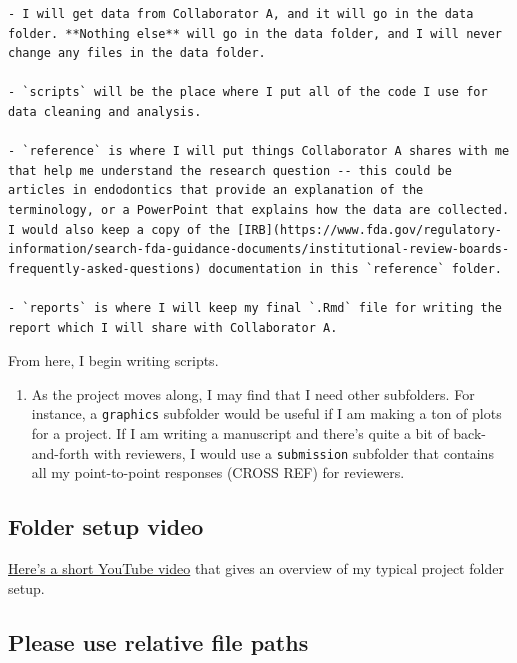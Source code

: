 \documentclass[
]{book}
\providecommand{\tightlist}{%
  \setlength{\itemsep}{0pt}\setlength{\parskip}{0pt}}
\begin{document}
\begin{verbatim}
- I will get data from Collaborator A, and it will go in the data folder. **Nothing else** will go in the data folder, and I will never change any files in the data folder.   

- `scripts` will be the place where I put all of the code I use for data cleaning and analysis. 

- `reference` is where I will put things Collaborator A shares with me that help me understand the research question -- this could be articles in endodontics that provide an explanation of the terminology, or a PowerPoint that explains how the data are collected. I would also keep a copy of the [IRB](https://www.fda.gov/regulatory-information/search-fda-guidance-documents/institutional-review-boards-frequently-asked-questions) documentation in this `reference` folder.  

- `reports` is where I will keep my final `.Rmd` file for writing the report which I will share with Collaborator A. 
\end{verbatim}

From here, I begin writing scripts.

\begin{enumerate}
\def\labelenumi{\arabic{enumi}.}
\setcounter{enumi}{4}
\tightlist
\item
  As the project moves along, I may find that I need other subfolders. For instance, a \texttt{graphics} subfolder would be useful if I am making a ton of plots for a project. If I am writing a manuscript and there's quite a bit of back-and-forth with reviewers, I would use a \texttt{submission} subfolder that contains all my point-to-point responses (CROSS REF) for reviewers.
\end{enumerate}

\hypertarget{folder-video}{%
\subsection{Folder setup video}\label{folder-video}}

\href{https://youtu.be/4UxoLIOmkzc}{Here's a short YouTube video} that gives an overview of my typical project folder setup.

\hypertarget{please-use-relative-file-paths}{%
\subsection{Please use relative file paths}\label{please-use-relative-file-paths}}
\end{document}
